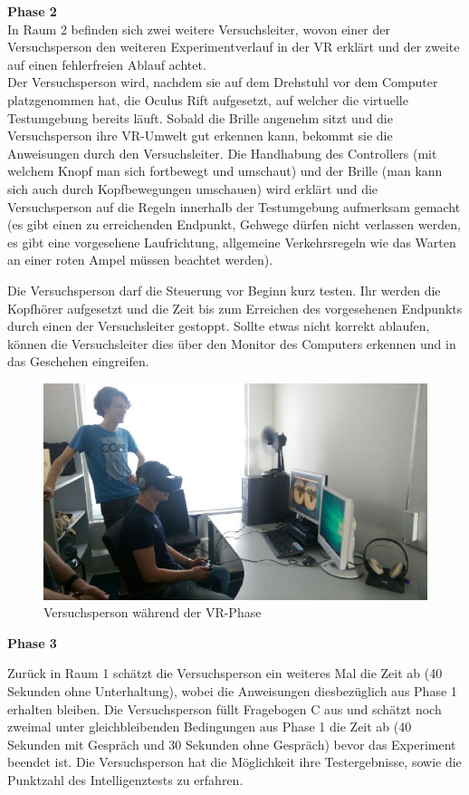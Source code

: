 \documentclass{Bericht}
\begin{document}
\textbf{Phase 2}\\ 
In Raum 2 befinden sich zwei weitere Versuchsleiter, wovon einer der Versuchsperson den weiteren Experimentverlauf in der VR erklärt und der zweite auf einen fehlerfreien Ablauf achtet.\\
Der Versuchsperson wird, nachdem sie auf dem Drehstuhl vor dem Computer platzgenommen hat, die Oculus Rift aufgesetzt, auf welcher die virtuelle Testumgebung bereits läuft. Sobald die Brille angenehm sitzt und die Versuchsperson ihre VR-Umwelt gut erkennen kann, bekommt sie die Anweisungen durch den Versuchsleiter. 
Die Handhabung des Controllers (mit welchem Knopf man sich fortbewegt und umschaut) und der Brille (man kann sich auch durch Kopfbewegungen umschauen) wird erklärt und die Versuchsperson auf die Regeln innerhalb der Testumgebung aufmerksam gemacht (es gibt einen zu erreichenden Endpunkt, Gehwege dürfen nicht verlassen werden, es gibt eine vorgesehene Laufrichtung, allgemeine Verkehrsregeln wie das Warten an einer roten Ampel müssen beachtet werden).  

Die Versuchsperson darf die Steuerung vor Beginn kurz testen. Ihr werden die Kopfhörer aufgesetzt und die Zeit bis zum Erreichen des vorgesehenen Endpunkts durch einen der Versuchsleiter gestoppt.
Sollte etwas nicht korrekt ablaufen, können die Versuchsleiter dies über den Monitor des Computers erkennen und in das Geschehen eingreifen.

\begin{figure}[H]
	\centering    
	\includegraphics[height=\textheight, width=\linewidth, keepaspectratio]{../Bilder/v.jpg}
	\caption{Versuchsperson während der VR-Phase}
	\label{img:versuchsperson-in-vr}
\end{figure}

\textbf{Phase 3}

Zurück in Raum 1 schätzt die Versuchsperson ein weiteres Mal die Zeit ab (40 Sekunden ohne Unterhaltung), wobei die Anweisungen diesbezüglich aus Phase 1 erhalten bleiben. Die Versuchsperson füllt Fragebogen C aus und schätzt noch zweimal unter gleichbleibenden Bedingungen aus Phase 1 die Zeit ab (40 Sekunden mit Gespräch und 30 Sekunden ohne Gespräch) bevor das Experiment beendet ist. Die Versuchsperson hat die Möglichkeit ihre Testergebnisse, sowie die Punktzahl des Intelligenztests zu erfahren.
\end{document}
